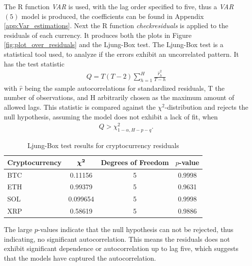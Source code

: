 \noindent The R function \textit{VAR} is used, with the lag order specified to five, thus a \textit{VAR}$(5)$ model is produced, the coefficients can be found in Appendix \ref{app:Var_estimations}. Next the R function \textit{checkresiduals} is applied to the residuals of each currency. It produces both the plots in Figure \ref{fig:plot_over_residuals} and the Ljung-Box test. The Ljung-Box test is a statistical tool used, to analyze if the errors exhibit an uncorrelated pattern. It has the test statistic 
\begin{align*}
    Q=T(T-2)\sum^H_{h=1}\frac{\hat{r}^2_{h}}{T-h}
\end{align*}
with $\hat{r}$ being the sample autocorrelations for standardized residuals, T the number of observations, and H arbitrarily chosen as the maximum amount of allowed lags. This statistic is compared against the $\chi^2$-distribution and rejects the null hypothesis, assuming the model does not exhibit a lack of fit, when
\begin{align*}
    Q>\chi^2_{1-\alpha,H-p-q}.
\end{align*}
\begin{table}[H]
\centering
\begin{tabular}{|l|c|c|c|}
\hline
\textbf{Cryptocurrency} & $\boldsymbol{\chi^2}$ & \textbf{Degrees of Freedom} & \textbf{$p$-value} \\
\hline
BTC & 0.11156 & 5 & 0.9998 \\
ETH & 0.99379 & 5 & 0.9631 \\
SOL & 0.099654 & 5 & 0.9998 \\
XRP & 0.58619 & 5 & 0.9886 \\
\hline
\end{tabular}
\caption{Ljung-Box test results for cryptocurrency residuals}
\label{tab:ljung_box}
\end{table}
\noindent The large $p$-values indicate that the null hypothesis can not be rejected, thus indicating, no significant autocorrelation. This means the residuals does not exhibit significant dependence or autocorrelation up to lag five, which suggests that the models have captured the autocorrelation.
